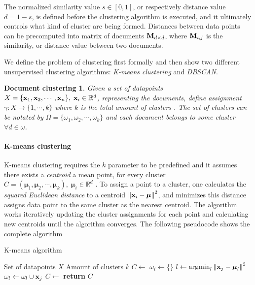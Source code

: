 \newpage

The normalized similarity value $s \in [0, 1]$, or respectively distance value $d = 1 - s$, is defined before the clustering algorithm is executed, and it ultimately controls what kind of cluster are being formed. Distances between data points can be precomputed into matrix of documents $\mathbf{M}_{d \times d}$, where $\mathbf{M}_{i, j}$ is the similarity, or distance value between two documents. 

We define the problem of clustering first formally and then show two different unsupervised clustering algorithms: \emph{K-means clustering} and \emph{DBSCAN}.

\newtheorem*{docclus}{Document clustering}
\begin{docclus}
Given a set of datapoints $X = \{\mathbf{x}_1, \mathbf{x}_2, \cdots, \mathbf{x}_n\},  \; \mathbf{x}_i \in \mathbb{R}^d$, representing the documents, define assignment $\gamma: X \rightarrow \{1, \cdots, k\}$ where $k$ is the total amount of clusters \cite{Manning:2008:IIR:1394399}. The set of clusters can be notated by $\Omega = \{\omega_1, \omega_2, \cdots, \omega_k\}$ and each document belongs to some cluster $\forall d \in \omega$. 
\end{docclus}


\paragraph{K-means clustering}

K-means clustering requires the $k$ parameter to be predefined and it assumes there exists a \emph{centroid} \ie a mean point, for every cluster $C = (\boldsymbol{\mu}_1, \boldsymbol{\mu}_2, \cdots, \boldsymbol{\mu}_k), \; \boldsymbol{\mu}_i \in \mathbb{R}^d$ \cite{Manning:2008:IIR:1394399}. To assign a point to a cluster, one calculates the \emph{squared Euclidean distance} to a centroid $\left\lVert\mathbf{x}_i - \boldsymbol{\mu}\right\rVert^2$, and minimizes this distance \ie assigns data point to the same cluster as the nearest centroid. The algorithm works iteratively updating the cluster assignments for each point and calculating new centroids until the algorithm converges. The following pseudocode shows the complete algorithm

\begin{algorithm}[ht]
\caption{K-means algorithm \cite{Manning:2008:IIR:1394399}}
\label{alg-kmeans}
\begin{algorithmic}

\Require Set of datapoints $X$
\Require Amount of clusters $k$
   \State $C  \leftarrow $ 
            \State $\omega_i \gets \{\} $
       \EndFor
            \State $l \gets \operatorname*{argmin}_{l} \left\lVert\mathbf{x}_j - \boldsymbol{\mu}_l\right\rVert^2$
            \State $\omega_l \gets \omega_l \cup \mathbf{x}_j$
        \EndFor
       \State $C \gets $ 
   \EndWhile
\State \textbf{return} $C$
\EndProcedure

\end{algorithmic}
\end{algorithm}

